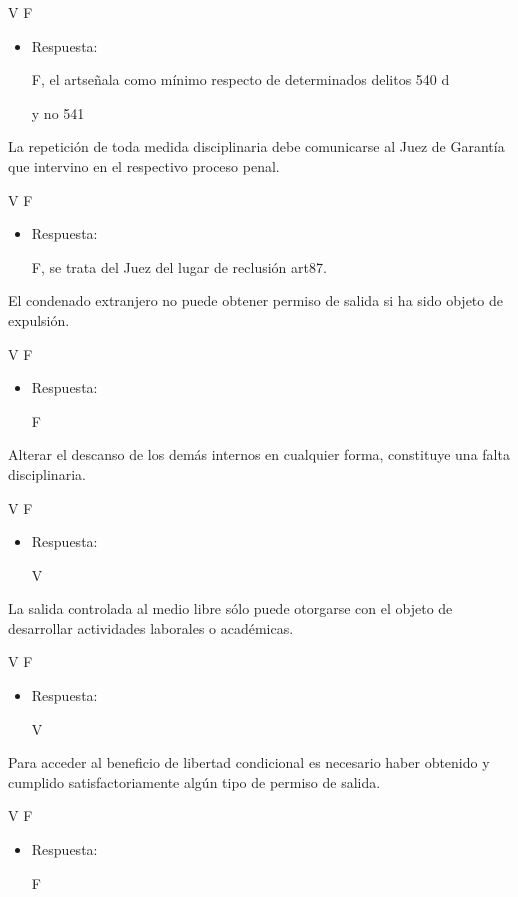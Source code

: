 \documentclass[letterpaper, 11pt]{article}
\begin{document}
V F

\begin{itemize}
\item Respuesta:

F, el artseñala como mínimo respecto de determinados delitos 540 d

y no 541
\end{itemize}

La repetición de toda medida disciplinaria debe comunicarse al Juez de
Garantía que intervino en el respectivo proceso penal.

V F

\begin{itemize}
\item Respuesta:

F, se trata del Juez del lugar de reclusión art87.
\end{itemize}



El condenado extranjero no puede obtener permiso de salida si ha sido
objeto de expulsión.

V F

\begin{itemize}
\item Respuesta:

F
\end{itemize}


Alterar el descanso de los demás internos en cualquier forma,
constituye una falta disciplinaria.

V F

\begin{itemize}
\item Respuesta:

V
\end{itemize}

La salida controlada al medio libre sólo puede otorgarse con el objeto
de desarrollar actividades laborales o académicas.

V F

\begin{itemize}
\item Respuesta:

V
\end{itemize}

Para acceder al beneficio de libertad condicional es necesario haber
obtenido y cumplido satisfactoriamente algún tipo de permiso de
salida.

V F

\begin{itemize}
\item Respuesta:

F
\end{itemize}
\end{document}
